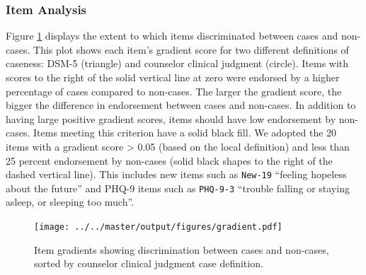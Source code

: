 \documentclass[man,natbib,longtable]{apa6}\usepackage[]{graphicx}\usepackage[]{color}
\begin{document}
\begin{table}[H]
\scalebox{1}{
  \centerline{\begin{threeparttable}
  \caption{Diagnostic results by maternal status}
  \label{tbl:diagnostic}
  \centering
  \begin{tabular}{lllll}
  \toprule
  Classifications & \multicolumn{1}{p{1.5cm}}{\centering Pregnant \\ \textit{n}=61} & \multicolumn{1}{p{1.5cm}}{\centering Postpartum \\ \textit{n}=132} & \multicolumn{1}{p{1.5cm}}{\centering All \\ \textit{n}=193} \\
  \midrule
  \expandableinput ../../master/output/tables/part5.tex
  \bottomrule
  \end{tabular}
  \begin{tablenotes}
  \small
  \item 
  \end{tablenotes}
  \end{threeparttable}}%
}
\end{table}

\subsubsection{Item Analysis}

Figure \ref{gradient} displays the extent to which items discriminated between cases and non-cases. This plot shows each item's gradient score for two different definitions of caseness: DSM-5 (triangle) and counselor clinical judgment (circle). Items with scores to the right of the solid vertical line at zero were endorsed by a higher percentage of cases compared to non-cases. The larger the gradient score, the bigger the difference in endorsement between cases and non-cases. In addition to having large positive gradient scores, items should have low endorsement by non-cases. Items meeting this criterion have a solid black fill. We adopted the 20 items with a gradient score > 0.05 (based on the local definition) and less than 25 percent endorsement by non-cases (solid black shapes to the right of the dashed vertical line). This includes new items such as \texttt{New-19} ``feeling hopeless about the future'' and PHQ-9 items such as \texttt{PHQ-9-3} ``trouble falling or staying asleep, or sleeping too much''.

\begin{figure}[H]
\centering
\texttt{[image: ../../master/output/figures/gradient.pdf]}
\caption{Item gradients showing discrimination between cases and non-cases, sorted by counselor clinical judgment case definition.}
\label{gradient}
\end{figure}
\end{document}
